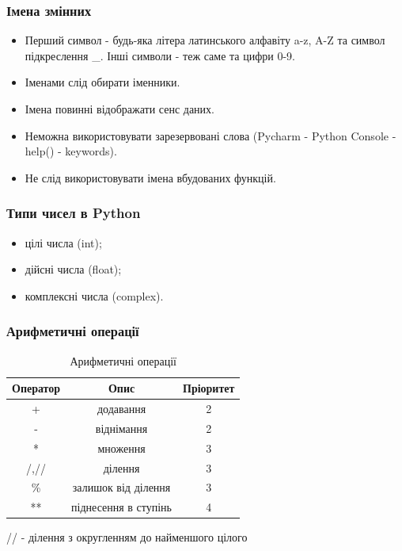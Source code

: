 \begin{frame}
\frametitle{Імена змінних}
\begin{itemize}
  \item Перший символ - будь-яка літера латинського алфавіту a-z, A-Z та символ підкреслення \_. Інші символи - теж саме та цифри 0-9.
  \item Іменами слід обирати іменники.
  \item Імена повинні відображати сенс даних.
  \item Неможна використовувати зарезервовані слова (Pycharm - Python Console - help() - keywords).
  \item Не слід використовувати імена вбудованих функцій.
\end{itemize}
\end{frame}
 
\begin{frame}
\frametitle{Типи чисел в Python}
\begin{itemize}
  \item цілі числа (int);
  \item дійсні числа (float);
  \item комплексні числа (complex).
\end{itemize} 
  
\end{frame}

 
\begin{frame}
\frametitle{Арифметичні операції}

\begin{table}
  \caption{Арифметичні операції}
  \label{tab:}

  \begin{center}
    \begin{tabular}{|c|c|c|}
      \hline
      \textbf{Оператор} & \textbf{Опис} & \textbf{Пріоритет} \\
      \hline
      + & додавання & 2 \\
       \hline
      - & віднімання & 2 \\
       \hline
      * & множення & 3 \\
       \hline
       /,// & ділення & 3 \\
       \hline
       \% & залишок від ділення & 3 \\
       \hline
       ** & піднесення в ступінь & 4 \\
       \hline
    \end{tabular}
  \end{center}
\end{table}
 \begin{center}
   \tiny{// - ділення з округленням до найменшого цілого}
  \end{center}
\end{frame}


